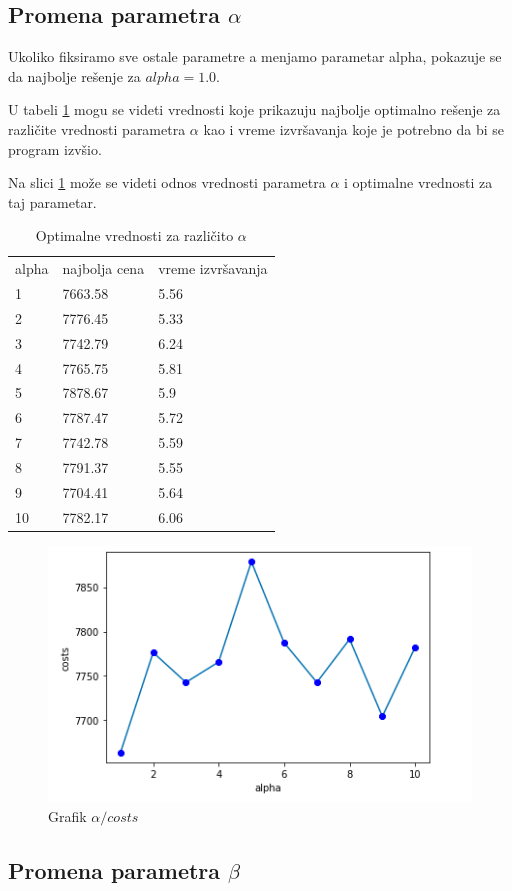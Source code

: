 \documentclass[a4paper]{article}
\begin{document}
\subsection{Promena parametra $\alpha$}

Ukoliko fiksiramo sve ostale parametre a menjamo parametar alpha, pokazuje se da najbolje rešenje za $alpha = 1.0$.

U tabeli \ref{tab:alpha} mogu se videti vrednosti koje prikazuju najbolje optimalno rešenje za različite vrednosti parametra $\alpha$ kao i vreme izvršavanja koje je potrebno da bi se program izvšio.

Na slici \ref{fig:alpha} može se videti odnos vrednosti parametra $\alpha$ i optimalne vrednosti za taj parametar.

\hfill \break

\begin{table}
\begin{center}
\begin{tabular}{ |p{2cm}|p{2cm}|p{2cm}|  }
\hline
\rowcolor{lightgray} \multicolumn{3}{|c|}{Promena parametra $\alpha$} \\
\hline
alpha & najbolja cena & vreme izvršavanja \\
\hline
\rowcolor{cyan}
1 & 7663.58 & 5.56 \\
2 & 7776.45 & 5.33 \\
3  &7742.79 & 6.24 \\
4  &7765.75 & 5.81 \\
5 & 7878.67 & 5.9 \\
6 & 7787.47 & 5.72  \\
7 & 7742.78 & 5.59 \\
8 & 7791.37 & 5.55 \\
9 & 7704.41 & 5.64 \\
10 & 7782.17 & 6.06 \\
\hline
\end{tabular}
\end{center}
\caption {Optimalne vrednosti za različito $\alpha$ \label{tab:alpha}}
\end{table}

\begin{figure}[h!]
\begin{center}
\includegraphics[scale=0.7]{alpha.png}
\end{center}
\caption{Grafik $\alpha / costs$}
\label{fig:alpha}
\end{figure}

\subsection{Promena parametra $\beta$}

\newpage


 

\nocite{opt}
\nocite{oppfanc}
\nocite{aneffect}
\end{document}
